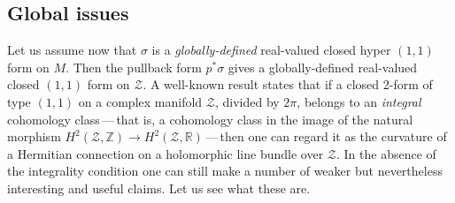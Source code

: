 \documentclass[11pt]{amsart}
\theoremstyle{remark}
\theoremstyle{remark}
\theoremstyle{definition}
\theoremstyle{definition}
\theoremstyle{definition}
\newcommand{\0}{{\scriptstyle 0'}} %
\newcommand{\1}{{\scriptstyle 1'}}
\begin{document}
\subsection{Global issues}  \label{ssec:global_iss} \hfill \medskip


Let us assume now that $\sigma$ is a \textit{globally-defined} real-valued closed hyper $(1,1)$ form on $M$. Then the pullback form $p^*\sigma$ gives a globally-defined real-valued closed $(1,1)$ form on $\mathcal{Z}$. A well-known result states that if a closed 2-form of type $(1,1)$ on a complex manifold $\mathcal{Z}$, divided by $2\pi$, belongs to an \textit{integral} cohomology class\,---\,that is, a cohomology class in the image of the natural morphism $H^2(\mathcal{Z},\mathbb{Z}) \rightarrow H^2(\mathcal{Z},\mathbb{R})$\,---\,then one can regard it as the curvature of a Hermitian connection on a holomorphic line bundle over $\mathcal{Z}$. In the absence of the integrality condition one can still make a number of weaker but nevertheless interesting and useful claims. Let us see what these are.
\end{document}
